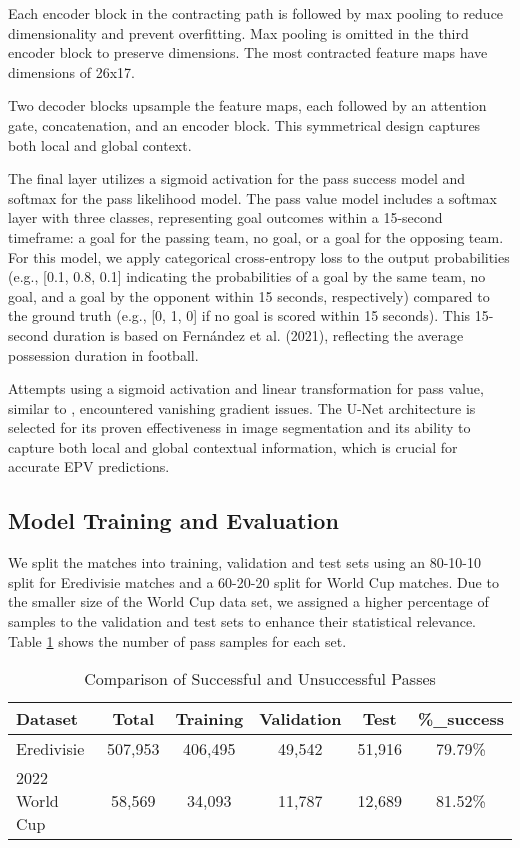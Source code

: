 Each encoder block in the contracting path is followed by max pooling to reduce dimensionality and prevent overfitting. Max pooling is omitted in the third encoder block to preserve dimensions.  The most contracted feature maps have dimensions of 26x17.

Two decoder blocks upsample the feature maps, each followed by an attention gate, concatenation, and an encoder block. This symmetrical design captures both local and global context.

The final layer utilizes a sigmoid activation for the pass success model and softmax for the pass likelihood model. The pass value model includes a softmax layer with three classes, representing goal outcomes within a 15-second timeframe: a goal for the passing team, no goal, or a goal for the opposing team. For this model, we apply categorical cross-entropy loss to the output probabilities (e.g., [0.1, 0.8, 0.1] indicating the probabilities of a goal by the same team, no goal, and a goal by the opponent within 15 seconds, respectively) compared to the ground truth (e.g., [0, 1, 0] if no goal is scored within 15 seconds). This 15-second duration is based on Fernández et al. (2021), reflecting the average possession duration in football.

Attempts using a sigmoid activation and linear transformation for pass value, similar to \cite{Fernández2021}, encountered vanishing gradient issues.  The U-Net architecture is selected for its proven effectiveness in image segmentation and its ability to capture both local and global contextual information, which is crucial for accurate EPV predictions.

\subsection{Model Training and Evaluation}

We split the matches into training, validation and test sets using an 80-10-10 split for Eredivisie matches and a 60-20-20 split for World Cup matches. Due to the smaller size of the World Cup data set, we assigned a higher percentage of samples to the validation and test sets to enhance their statistical relevance. Table \ref{tab:passes_comparison} shows the number of pass samples for each set.

\begin{table}[ht]
\centering
\caption{Comparison of Successful and Unsuccessful Passes}
\label{tab:passes_comparison}
\begin{tabular}{lccccc}
\hline
Dataset & Total & Training & Validation & Test & \%\_success \\ \hline
Eredivisie & 507,953  & 406,495 & 49,542 & 51,916 & 79.79\% \\
2022 World Cup & 58,569 & 34,093 & 11,787 & 12,689 & 81.52\% \\
\hline
\end{tabular}
\end{table}


